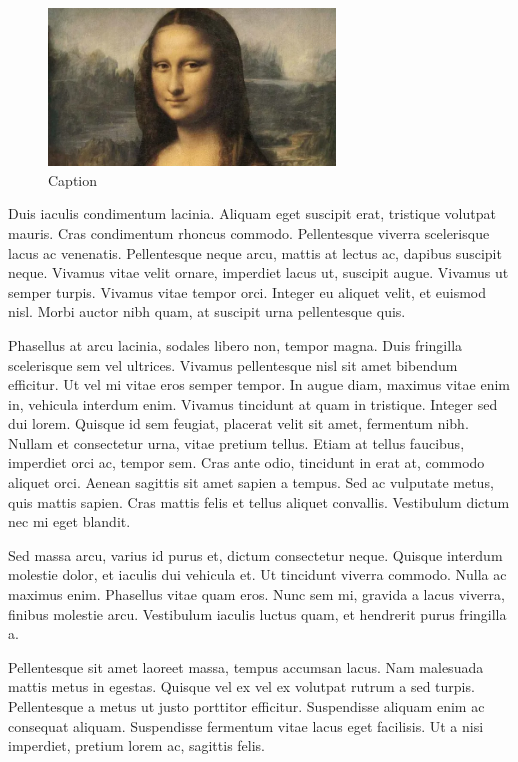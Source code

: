 \documentclass[a4paper,fleqn]{cas-dc}
\begin{document}
\begin{figure}
    \centering
    \includegraphics[width=3in]{image.png}
    \caption{Caption}
    \label{fig:enter-label}
\end{figure}

Duis iaculis condimentum lacinia. Aliquam eget suscipit erat, tristique volutpat mauris. Cras condimentum rhoncus commodo. Pellentesque viverra scelerisque lacus ac venenatis. Pellentesque neque arcu, mattis at lectus ac, dapibus suscipit neque. Vivamus vitae velit ornare, imperdiet lacus ut, suscipit augue. Vivamus ut semper turpis. Vivamus vitae tempor orci. Integer eu aliquet velit, et euismod nisl. Morbi auctor nibh quam, at suscipit urna pellentesque quis\citep{SAIDMOHAMED2021}.

Phasellus at arcu lacinia, sodales libero non, tempor magna. Duis fringilla scelerisque sem vel ultrices. Vivamus pellentesque nisl sit amet bibendum efficitur. Ut vel mi vitae eros semper tempor. In augue diam, maximus vitae enim in, vehicula interdum enim. Vivamus tincidunt at quam in tristique. Integer sed dui lorem. Quisque id sem feugiat, placerat velit sit amet, fermentum nibh. Nullam et consectetur urna, vitae pretium tellus. Etiam at tellus faucibus, imperdiet orci ac, tempor sem. Cras ante odio, tincidunt in erat at, commodo aliquet orci. Aenean sagittis sit amet sapien a tempus. Sed ac vulputate metus, quis mattis sapien. Cras mattis felis et tellus aliquet convallis. Vestibulum dictum nec mi eget blandit\citep{terentev2022earlydetection}.

Sed massa arcu, varius id purus et, dictum consectetur neque. Quisque interdum molestie dolor, et iaculis dui vehicula et. Ut tincidunt viverra commodo. Nulla ac maximus enim. Phasellus vitae quam eros. Nunc sem mi, gravida a lacus viverra, finibus molestie arcu. Vestibulum iaculis luctus quam, et hendrerit purus fringilla a.

Pellentesque sit amet laoreet massa, tempus accumsan lacus. Nam malesuada mattis metus in egestas. Quisque vel ex vel ex volutpat rutrum a sed turpis. Pellentesque a metus ut justo porttitor efficitur. Suspendisse aliquam enim ac consequat aliquam. Suspendisse fermentum vitae lacus eget facilisis. Ut a nisi imperdiet, pretium lorem ac, sagittis felis.
\end{document}
